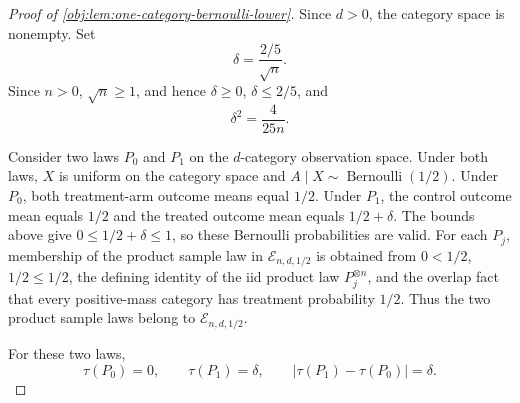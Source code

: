 \documentclass[11pt]{article}
\begin{document}
\begin{proof}[Proof of \cref{obj:lem:one-category-bernoulli-lower}]
Since \(d>0\), the category space is nonempty. Set
\[
\delta=\frac{2/5}{\sqrt n}.
\]
Since \(n>0\), \(\sqrt n\ge1\), and hence \(\delta\ge0\), \(\delta\le2/5\), and
\[
\delta^2=\frac{4}{25n}.
\]

Consider two laws \(P_0\) and \(P_1\) on the \(d\)-category observation space. Under both laws, \(X\) is uniform on the category space and \(A\mid X\sim\operatorname{Bernoulli}(1/2)\). Under \(P_0\), both treatment-arm outcome means equal \(1/2\). Under \(P_1\), the control outcome mean equals \(1/2\) and the treated outcome mean equals \(1/2+\delta\). The bounds above give \(0\le 1/2+\delta\le1\), so these Bernoulli probabilities are valid. For each \(P_j\), membership of the product sample law in \(\mathcal E_{n,d,1/2}\) is obtained from \(0<1/2\), \(1/2\le1/2\), the defining identity of the iid product law \(P_j^{\otimes n}\), and the overlap fact that every positive-mass category has treatment probability \(1/2\). Thus the two product sample laws belong to \(\mathcal E_{n,d,1/2}\). %

For these two laws,
\[
\tau(P_0)=0,
\qquad
\tau(P_1)=\delta,
\qquad
|\tau(P_1)-\tau(P_0)|=\delta .
\]


\end{proof}
\end{document}
